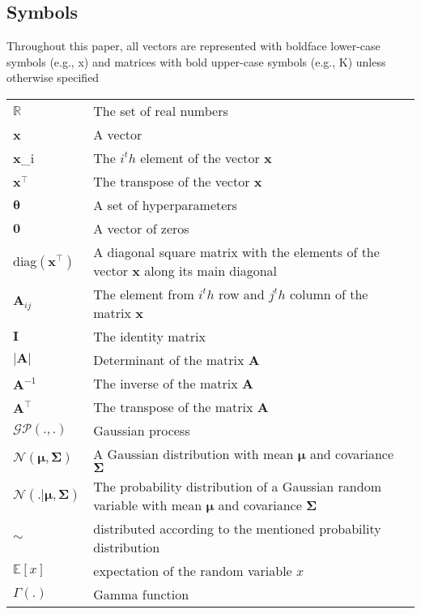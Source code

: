 \clearpage
\subsection{Symbols}
Throughout this paper, all vectors are represented with boldface lower-case symbols (e.g., x) and
matrices with bold upper-case symbols (e.g., K) unless otherwise specified %

\begin{table}[!htbp]
    {\renewcommand{\arraystretch}{1.5}
    \begin{tabularx}{0.99\textwidth}{ l| X }
      $\mathbb{R}$ & The set of real numbers \\
      \textbf{x} & A vector \\
      \textbf{x}_i & The $i^th$ element of the vector \textbf{x} \\
      $\textbf{x}^\top$ & The transpose of the vector \textbf{x} \\
      $\boldsymbol{\theta}$ & A set of hyperparameters \\
      $\textbf{0}$ & A vector of zeros \\
      diag$\left(\textbf{x}^\top\right)$ & A diagonal square matrix with the elements of the vector \textbf{x} along its main diagonal \\
      $\textbf{A}_{ij}$ & The element from $i^th$ row and $j^th$ column of the matrix \textbf{x} \\
      $\textbf{I}$ & The identity matrix \\ 
      $|\textbf{A}|$ & Determinant of the matrix \textbf{A} \\
      $\textbf{A}^{-1}$ & The inverse of the matrix \textbf{A} \\
      $\textbf{A}^\top$ & The transpose of the matrix \textbf{A} \\     
      $\mathcal{GP}\left(.,.\right)$ & Gaussian process \\
      $\mathcal{N}\left(\boldsymbol{\mu},\boldsymbol{\Sigma}\right)$ & A Gaussian distribution with mean $\boldsymbol{\mu}$ and covariance $\boldsymbol{\Sigma}$ \\
      $\mathcal{N}\left(.|\boldsymbol{\mu},\boldsymbol{\Sigma}\right)$ & The probability distribution of a Gaussian random variable with mean $\boldsymbol{\mu}$ and covariance $\boldsymbol{\Sigma}$ \\
      $\sim$ & distributed according to the mentioned probability distribution \\
      $\mathbb{E}\left[x\right]$ & expectation of the random variable $x$ \\
      $\Gamma\left(.\right)$ & Gamma function \\
    \end{tabularx}
    }
\end{table}


